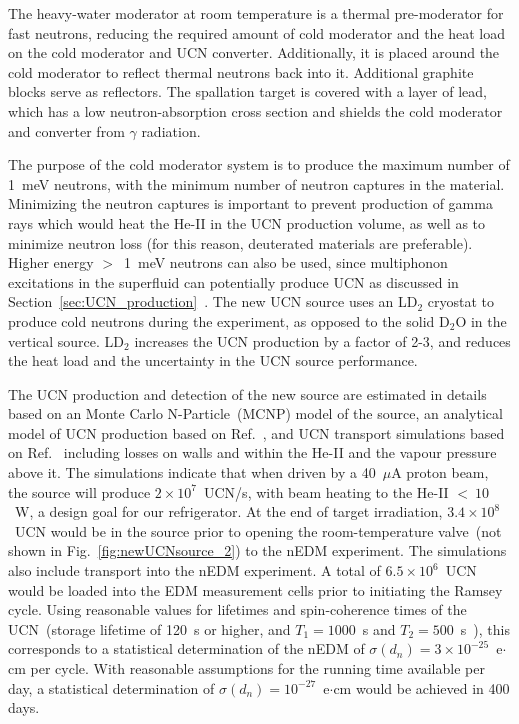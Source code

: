 The heavy-water moderator at room temperature is a thermal
pre-moderator for fast neutrons, reducing the required amount of cold
moderator and the heat load on the cold moderator and UCN
converter. Additionally, it is placed around the cold moderator to
reflect thermal neutrons back into it. Additional graphite blocks
serve as reflectors. The spallation target is covered with a layer of
lead, which has a low neutron-absorption cross section and shields the
cold moderator and converter from $\gamma$ radiation.

The purpose of the cold moderator system is to produce the maximum
number of 1~meV neutrons, with the minimum number of neutron captures
in the material. Minimizing the neutron captures is important to
prevent production of gamma rays which would heat the He-II in the UCN
production volume, as well as to minimize neutron loss (for this
reason, deuterated materials are preferable). Higher energy $>$~1~meV
neutrons can also be used, since multiphonon excitations in the
superfluid can potentially produce UCN as discussed in
Section~\ref{sec:UCN_production}~\cite{Schmidt2009,
  Korobkina2002}. The new UCN source uses an LD$_2$ cryostat to
produce cold neutrons during the experiment, as opposed to the solid
D$_2$O in the vertical source. LD$_2$ increases the UCN production by
a factor of 2-3, and reduces the heat load and the uncertainty in the
UCN source performance.



The UCN production and detection of the new source are estimated in
details based on an Monte Carlo N-Particle~(MCNP) model of the source,
an analytical model of UCN production based on
Ref.~\cite{Korobkina2002}, and UCN transport simulations based on
Ref.~\cite{schreyer2017pentrack} including losses on walls and within
the He-II and the vapour pressure above it.  The simulations indicate
that when driven by a 40~$\mu$A proton beam, the source will produce
$2\times 10^7$~UCN/s, with beam heating to the He-II $<~10$~W, a
design goal for our refrigerator. At the end of target irradiation,
$3.4\times 10^8$~UCN would be in the source prior to opening the
room-temperature valve~(not shown in Fig.~\ref{fig:newUCNsource_2}) to
the nEDM experiment.  The simulations also include transport into the
nEDM experiment. A total of $6.5 \times 10^6$~UCN would be loaded into
the EDM measurement cells prior to initiating the Ramsey cycle. Using
reasonable values for lifetimes and spin-coherence times of the
UCN~(storage lifetime of 120~s or higher, and $T_1 = 1000$~s and
$T_2 = 500$~s~\cite{cdr2018}), this corresponds to a statistical
determination of the nEDM of
$\sigma(d_n) = 3\times 10^{-25}$~e$\cdot$cm per cycle. With reasonable
assumptions for the running time available per day, a statistical
determination of $\sigma(d_n) = 10^{-27}$~e$\cdot$cm would be achieved
in 400 days.

